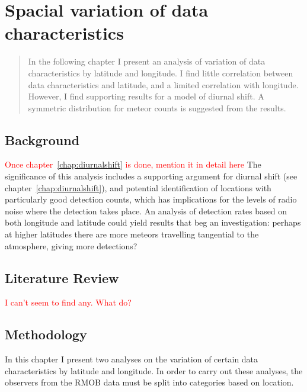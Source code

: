 \chapter{Spacial variation of data characteristics}
\label{chap:spatial}
\begin{strip}
	\begin{minipage}{\textwidth}
		\begin{abstract}
			In the following chapter I present an analysis of variation of data characteristics by latitude and longitude. I find little correlation between data characteristics and latitude, and a limited correlation with longitude. However, I find supporting results for a model of diurnal shift. A symmetric distribution for meteor counts is suggested from the results.
		\end{abstract}
	\end{minipage}
\end{strip}
\section{Background}
\textcolor{red}{Once chapter~\ref{chap:diurnalshift} is done, mention it in detail here}
The significance of this analysis includes a supporting argument for diurnal shift (see chapter~\ref{chap:diurnalshift}), and potential identification of locations with particularly good detection counts, which has implications for the levels of radio noise where the detection takes place. An analysis of detection rates based on both longitude and latitude could yield results that beg an investigation: perhaps at higher latitudes there are more meteors travelling tangential to the atmosphere, giving more detections?
\section{Literature Review}
\textcolor{red}{I can't seem to find any. What do?}
\section{Methodology}
In this chapter I present two analyses on the variation of certain data characteristics by latitude and longitude. In order to carry out these analyses, the observers from the RMOB data must be split into categories based on location.
